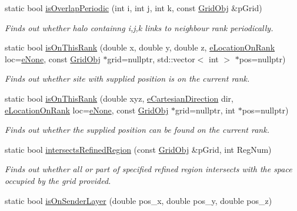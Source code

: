 \begin{DoxyCompactItemize}
static bool \hyperlink{class_grid_utils_a7c13884020ab181ee8cb6dd2ea7e4fd7}{is\+Overlap\+Periodic} (int i, int j, int k, const \hyperlink{class_grid_obj}{Grid\+Obj} \&p\+Grid)
\begin{DoxyCompactList}\small\item\em Finds out whether halo containng i,j,k links to neighbour rank periodically. \end{DoxyCompactList}\item 
static bool \hyperlink{class_grid_utils_adcf9512bd143ac0b9ef7eec33f1510ec}{is\+On\+This\+Rank} (double x, double y, double z, \hyperlink{_grid_utils_8h_a478f1e2cf9934de79a892e60980598dc}{e\+Location\+On\+Rank} loc=\hyperlink{_grid_utils_8h_a478f1e2cf9934de79a892e60980598dca6505acf15690a324459e652a94fc339a}{e\+None}, const \hyperlink{class_grid_obj}{Grid\+Obj} $\ast$grid=nullptr, std\+::vector$<$ int $>$ $\ast$pos=nullptr)
\begin{DoxyCompactList}\small\item\em Finds out whether site with supplied position is on the current rank. \end{DoxyCompactList}\item 
static bool \hyperlink{class_grid_utils_a4eca1ee0dff756b5cd65d45f84b24118}{is\+On\+This\+Rank} (double xyz, \hyperlink{_grid_utils_8h_afbad8e4a2f1e9903755b1bd2fe8273cf}{e\+Cartesian\+Direction} dir, \hyperlink{_grid_utils_8h_a478f1e2cf9934de79a892e60980598dc}{e\+Location\+On\+Rank} loc=\hyperlink{_grid_utils_8h_a478f1e2cf9934de79a892e60980598dca6505acf15690a324459e652a94fc339a}{e\+None}, const \hyperlink{class_grid_obj}{Grid\+Obj} $\ast$grid=nullptr, int $\ast$pos=nullptr)
\begin{DoxyCompactList}\small\item\em Finds out whether the supplied position can be found on the current rank. \end{DoxyCompactList}\item 
static bool \hyperlink{class_grid_utils_a14da5d778eb6d81fbcd5c9331a8082dd}{intersects\+Refined\+Region} (const \hyperlink{class_grid_obj}{Grid\+Obj} \&p\+Grid, int Reg\+Num)
\begin{DoxyCompactList}\small\item\em Finds out whether all or part of specified refined region intersects with the space occupied by the grid provided. \end{DoxyCompactList}\item 
static bool \hyperlink{class_grid_utils_af0692236725709af2d98872805fc84ae}{is\+On\+Sender\+Layer} (double pos\+\_\+x, double pos\+\_\+y, double pos\+\_\+z)

\end{DoxyCompactItemize}

